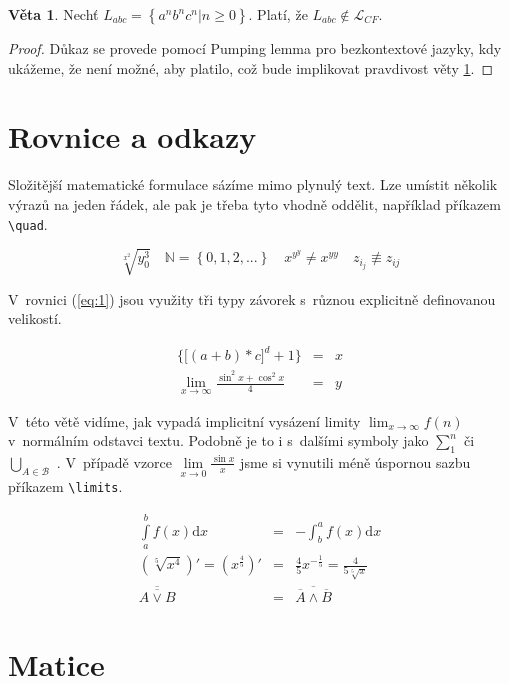 \documentclass[11pt,a4paper,twocolumn]{article}
\theoremstyle{definition}
\newtheorem{veta}{Věta}
\begin{document}
\begin{veta}\label{veta:1}Nechť $L_{abc} = \left\{ a^nb^nc^n|n \geq 0 \right\}$. Platí, že $L_{abc} \notin \mathcal{L} _{CF}$.\end{veta}

\begin{proof}Důkaz se provede pomocí Pumping lemma pro bezkontextové jazyky, kdy ukážeme, že není možné, aby platilo, což bude implikovat pravdivost věty \ref{veta:1}.\end{proof}

\section{Rovnice a odkazy}

Složitější matematické formulace sázíme mimo plynulý text. Lze umístit několik výrazů na jeden řádek, ale pak je třeba tyto vhodně oddělit, například příkazem \verb|\quad|.

$$\sqrt[x^2]{y^3_0} \quad \mathbb{N} = \left\{0,1,2,...\right\} \quad x^{y^y} \ne x^{yy} \quad z_{i_j} \not \equiv z_{ij} $$ 

V~rovnici (\ref{eq:1}) jsou využity tři typy závorek s~různou explicitně definovanou velikostí.

\begin{eqnarray} \label{eq:1}
    \bigg\{ \Big[ \left( a+b\right)*c \Big]^d + 1\bigg\} &=& x \\
    \lim_{x\to\infty} \frac{\sin^2x + \cos^2x}{4} &=& y \nonumber
\end{eqnarray}


V~této větě vidíme, jak vypadá implicitní vysázení limity $\lim_{x\to\infty}f(n)$ v~normálním odstavci textu. Podobně je to i s~dalšími symboly jako $\sum_{1}^{n}$ či $\bigcup _{A \in \mathcal{B}}$ . V~případě vzorce $\lim\limits_{x\to 0} \frac{\sin x}{x}$ jsme si vynutili méně úspornou sazbu příkazem \verb|\limits|.

\begin{eqnarray} 
    \int\limits_{a}^{b}f\left(x\right)\mathrm{d}x &=& - \int_{b}^{a} f\left(x\right)\mathrm{d}x \\
    \left(\sqrt[5]{x^4}\right)' = \left(x^{\frac{4}{5}}\right)' &=& \frac{4}{5}x^{-\frac{1}{5}} = \frac{4}{5\sqrt[5]{x}} \\
    \overline{\overline{A \lor B}} &=& \overline{\overline{A} \land \overline{B}}
\end{eqnarray}

\section{Matice}
\end{document}
